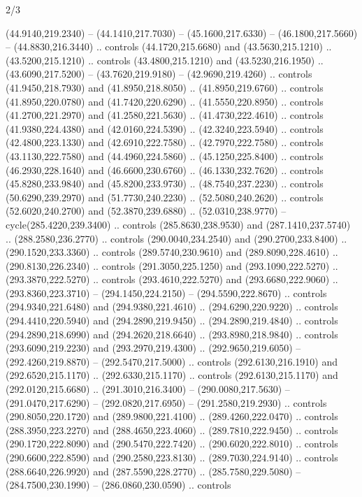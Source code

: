 \begin{flagdescription}{2/3}
\begin{scope}[xshift=0.5\flaglength,yshift=0.5\flagwidth,scale=\stretchfactor]
\begin{scope}[scale=0.001645\flagwidth,yshift=65mm,xshift=-63mm]
\begin{scope}[y=0.80pt, x=0.80pt, yscale=-1,]
\begin{scope}[cm={{1.33333,0.0,0.0,1.33333,(0.0,1e-05)}}]
  (44.9140,219.2340) -- (44.1410,217.7030) -- (45.1600,217.6330) --
  (46.1800,217.5660) -- (44.8830,216.3440) .. controls (44.1720,215.6680) and
  (43.5630,215.1210) .. (43.5200,215.1210) .. controls (43.4800,215.1210) and
  (43.5230,216.1950) .. (43.6090,217.5200) -- (43.7620,219.9180) --
  (42.9690,219.4260) .. controls (41.9450,218.7930) and (41.8950,218.8050) ..
  (41.8950,219.6760) .. controls (41.8950,220.0780) and (41.7420,220.6290) ..
  (41.5550,220.8950) .. controls (41.2700,221.2970) and (41.2580,221.5630) ..
  (41.4730,222.4610) .. controls (41.9380,224.4380) and (42.0160,224.5390) ..
  (42.3240,223.5940) .. controls (42.4800,223.1330) and (42.6910,222.7580) ..
  (42.7970,222.7580) .. controls (43.1130,222.7580) and (44.4960,224.5860) ..
  (45.1250,225.8400) .. controls (46.2930,228.1640) and (46.6600,230.6760) ..
  (46.1330,232.7620) .. controls (45.8280,233.9840) and (45.8200,233.9730) ..
  (48.7540,237.2230) .. controls (50.6290,239.2970) and (51.7730,240.2230) ..
  (52.5080,240.2620) .. controls (52.6020,240.2700) and (52.3870,239.6880) ..
  (52.0310,238.9770) -- cycle(285.4220,239.3400) .. controls (285.8630,238.9530)
  and (287.1410,237.5740) .. (288.2580,236.2770) .. controls (290.0040,234.2540)
  and (290.2700,233.8400) .. (290.1520,233.3360) .. controls (289.5740,230.9610)
  and (289.8090,228.4610) .. (290.8130,226.2340) .. controls (291.3050,225.1250)
  and (293.1090,222.5270) .. (293.3870,222.5270) .. controls (293.4610,222.5270)
  and (293.6680,222.9060) .. (293.8360,223.3710) -- (294.1450,224.2150) --
  (294.5590,222.8670) .. controls (294.9340,221.6480) and (294.9380,221.4610) ..
  (294.6290,220.9220) .. controls (294.4410,220.5940) and (294.2890,219.9450) ..
  (294.2890,219.4840) .. controls (294.2890,218.6990) and (294.2620,218.6640) ..
  (293.8980,218.9840) .. controls (293.6090,219.2230) and (293.2970,219.4300) ..
  (292.9650,219.6050) -- (292.4260,219.8870) -- (292.5470,217.5000) .. controls
  (292.6130,216.1910) and (292.6520,215.1170) .. (292.6330,215.1170) .. controls
  (292.6130,215.1170) and (292.0120,215.6680) .. (291.3010,216.3400) --
  (290.0080,217.5630) -- (291.0470,217.6290) -- (292.0820,217.6950) --
  (291.2580,219.2930) .. controls (290.8050,220.1720) and (289.9800,221.4100) ..
  (289.4260,222.0470) .. controls (288.3950,223.2270) and (288.4650,223.4060) ..
  (289.7810,222.9450) .. controls (290.1720,222.8090) and (290.5470,222.7420) ..
  (290.6020,222.8010) .. controls (290.6600,222.8590) and (290.2580,223.8130) ..
  (289.7030,224.9140) .. controls (288.6640,226.9920) and (287.5590,228.2770) ..
  (285.7580,229.5080) -- (284.7500,230.1990) -- (286.0860,230.0590) .. controls

\end{scope}
\end{scope}
\end{scope}
\end{scope}
\end{flagdescription}
